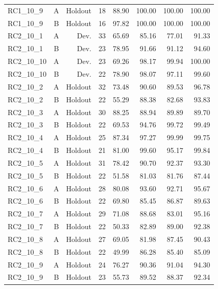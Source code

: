 \begin{longtable}{@{}lrrrrrrr@{}}
RC1\_10\_9 & A & Holdout & 18 & 88.90 & 100.00 & 100.00 & 100.00 \\
RC1\_10\_9 & B & Holdout & 16 & 97.82 & 100.00 & 100.00 & 100.00 \\
RC2\_10\_1 & A & Dev. & 33 & 65.69 & 85.16 & 77.01 & 91.33 \\
RC2\_10\_1 & B & Dev. & 23 & 78.95 & 91.66 & 91.12 & 94.60 \\
RC2\_10\_10 & A & Dev. & 23 & 69.26 & 98.17 & 99.94 & 100.00 \\
RC2\_10\_10 & B & Dev. & 22 & 78.90 & 98.07 & 97.11 & 99.60 \\
RC2\_10\_2 & A & Holdout & 32 & 73.48 & 90.60 & 89.53 & 96.78 \\
RC2\_10\_2 & B & Holdout & 22 & 55.29 & 88.38 & 82.68 & 93.83 \\
RC2\_10\_3 & A & Holdout & 30 & 88.25 & 88.94 & 89.89 & 89.70 \\
RC2\_10\_3 & B & Holdout & 22 & 69.53 & 94.76 & 99.72 & 99.49 \\
RC2\_10\_4 & A & Holdout & 25 & 87.34 & 97.27 & 99.99 & 99.75 \\
RC2\_10\_4 & B & Holdout & 21 & 81.00 & 99.60 & 95.17 & 99.84 \\
RC2\_10\_5 & A & Holdout & 31 & 78.42 & 90.70 & 92.37 & 93.30 \\
RC2\_10\_5 & B & Holdout & 22 & 51.58 & 81.03 & 81.76 & 87.44 \\
RC2\_10\_6 & A & Holdout & 28 & 80.08 & 93.60 & 92.71 & 95.67 \\
RC2\_10\_6 & B & Holdout & 22 & 69.80 & 85.45 & 86.87 & 89.63 \\
RC2\_10\_7 & A & Holdout & 29 & 71.08 & 88.68 & 83.01 & 95.16 \\
RC2\_10\_7 & B & Holdout & 22 & 50.33 & 82.89 & 89.00 & 92.38 \\
RC2\_10\_8 & A & Holdout & 27 & 69.05 & 81.98 & 87.45 & 90.43 \\
RC2\_10\_8 & B & Holdout & 22 & 49.99 & 86.28 & 85.40 & 85.09 \\
RC2\_10\_9 & A & Holdout & 24 & 76.27 & 90.36 & 91.04 & 94.30 \\
RC2\_10\_9 & B & Holdout & 23 & 55.73 & 89.52 & 88.37 & 92.34 \\
\bottomrule
\end{longtable}
\endgroup
